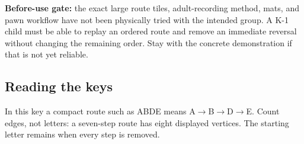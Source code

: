 \textbf{Before-use gate:} the exact large route tiles, adult-recording method, mats, and pawn workflow have not been physically tried with the intended group. A K-1 child must be able to replay an ordered route and remove an immediate reversal without changing the remaining order. Stay with the concrete demonstration if that is not yet reliable.

\subsection*{Reading the keys}
In this key a compact route such as ABDE means A$\to$B$\to$D$\to$E. Count edges, not letters: a seven-step route has eight displayed vertices. The starting letter remains when every step is removed.
